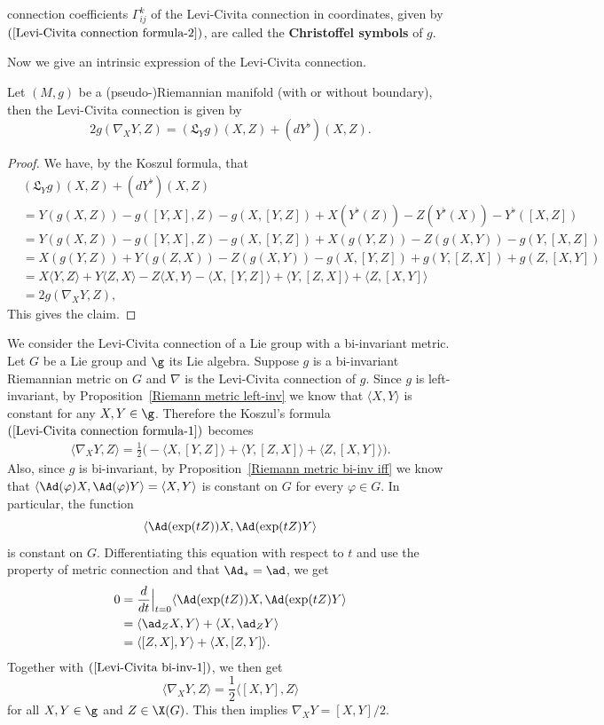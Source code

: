 connection coefficients $\Gamma_{ij}^k$ of the Levi-Civita connection in coordinates, given by $(\ref{Levi-Civita connection formula-2})$, are called the 
\textbf{Christoffel symbols} of $g$.\par
Now we give an intrinsic expression of the Levi-Civita connection.
\begin{proposition}\label{Riemann Levi-Civita Lie exterior}
Let $(M,g)$ be a (pseudo-)Riemannian manifold (with or without boundary), then the Levi-Civita connection is given by
\[2g(\nabla_XY,Z)=(\mathfrak{L}_Yg)(X,Z)+(d Y^\flat)(X,Z).\]
\end{proposition}
\begin{proof}
We have, by the Koszul formula, that
\begin{align*}
&(\mathfrak{L}_Yg)(X,Z)+(d Y^\flat)(X,Z)\\
&=Y(g(X,Z))-g([Y,X],Z)-g(X,[Y,Z])+X(Y^\flat(Z))-Z(Y^\flat(X))-Y^\flat([X,Z])\\
&=Y(g(X,Z))-g([Y,X],Z)-g(X,[Y,Z])+X(g(Y,Z))-Z(g(X,Y))-g(Y,[X,Z])\\
&=X(g(Y,Z))+Y(g(Z,X))-Z(g(X,Y))-g(X,[Y,Z])+g(Y,[Z,X])+g(Z,[X,Y])\\
&=X\langle Y,Z\rangle+Y\langle Z,X\rangle-Z\langle X,Y\rangle-\langle X,[Y,Z]\rangle+\langle Y,[Z,X]\rangle+\langle Z,[X,Y]\rangle\\
&=2g(\nabla_XY,Z),
\end{align*}
This gives the claim.
\end{proof}
\begin{example}\label{Levi-Civita on Lie group with bi-invariant metric}
We consider the Levi-Civita connection of a Lie group with a bi-invariant metric. Let $G$ be a Lie group and $\g$ its Lie algebra. Suppose $g$ is a bi-invariant Riemannian metric on $G$ and $\nabla$ is the Levi-Civita connection of $g$. Since $g$ is left-invariant, by Proposition~\ref{Riemann metric left-inv} we know that $\langle X,Y\rangle$ is constant for any $X,Y\in\g$. Therefore the 
Koszul's formula $(\ref{Levi-Civita connection formula-1})$ becomes
\begin{align}\label{Levi-Civita bi-inv-1}
\langle\nabla_XY,Z\rangle=\frac{1}{2}\big(-\langle X,[Y,Z]\rangle+\langle Y,[Z,X]\rangle+\langle Z,[X,Y]\rangle\big).
\end{align}
Also, since $g$ is bi-invariant, by Proposition~\ref{Riemann metric bi-inv iff} we know that $\langle\Ad(\varphi)X,\Ad(\varphi)Y\rangle=\langle X,Y\rangle$ is constant on $G$ for every $\varphi\in G$. In particular, the function 
\[\langle\Ad(\exp(tZ))X,\Ad(\exp(tZ)Y\rangle\]
is constant on $G$. Differentiating this equation with respect to $t$ and use the property of metric connection and that $\Ad_*=\ad$, we get
\begin{align*}
0&=\frac{d}{dt}\Big|_{t=0}\langle\Ad(\exp(tZ))X,\Ad(\exp(tZ)Y\rangle\\
&=\langle\ad_ZX,Y\rangle+\langle X,\ad_ZY\rangle\\
&=\langle[Z,X],Y\rangle+\langle X,[Z,Y]\rangle.
\end{align*}
Together with $(\ref{Levi-Civita bi-inv-1})$, we then get
\[\langle\nabla_XY,Z\rangle=\frac{1}{2}\langle[X,Y],Z\rangle\]
for all $X,Y\in\g$ and $Z\in\X(G)$. This then implies $\nabla_XY=[X,Y]/2$.
\end{example}
